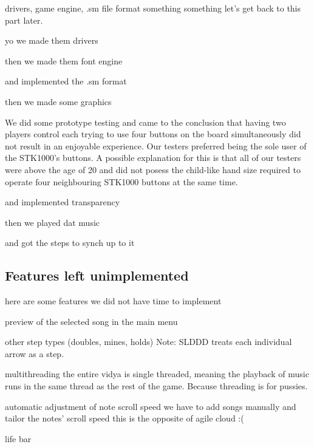drivers, game engine, .sm file format
something something let's get back to this part later.

yo we made them drivers

then we made them font engine

and implemented the .sm format

then we made some graphics

We did some prototype testing and came to the conclusion that having two players control each trying to use four buttons on the board simultaneously did not result in an enjoyable experience.
Our testers preferred being the sole user of the STK1000's buttons.
A possible explanation for this is that all of our testers were above the age of 20 and did not posess the child-like hand size required to operate four neighbouring STK1000 buttons at the same time.

and implemented transparency

then we played dat music

and got the steps to synch up to it

\subsection{Features left unimplemented}
	here are some features we did not have time to implement


	preview of the selected song in the main menu

	other step types (doubles, mines, holds)
		Note: SLDDD treats each individual arrow as a step. 

	multithreading
		the entire vidya is single threaded, meaning the playback of music runs in the same thread as the rest of the game. Because threading is for pussies.

	automatic adjustment of note scroll speed
		we have to add songs manually and tailor the notes' scroll speed
		this is the opposite of agile cloud :(

	life bar